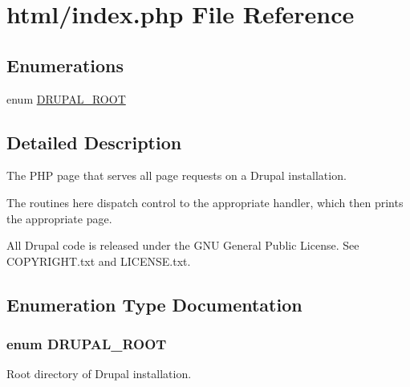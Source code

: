 \hypertarget{index_8php}{
\section{html/index.php File Reference}
\label{index_8php}
}
\subsection*{Enumerations}
\begin{DoxyCompactItemize}
\item 
enum \hyperlink{index_8php_a21cf187d162beffb1fbc5a1d1098f4f9}{DRUPAL\_\-ROOT} 
\end{DoxyCompactItemize}


\subsection{Detailed Description}
The PHP page that serves all page requests on a Drupal installation.

The routines here dispatch control to the appropriate handler, which then prints the appropriate page.

All Drupal code is released under the GNU General Public License. See COPYRIGHT.txt and LICENSE.txt. 

\subsection{Enumeration Type Documentation}
\hypertarget{index_8php_a21cf187d162beffb1fbc5a1d1098f4f9}{
\subsubsection[{DRUPAL\_\-ROOT}]{\setlength{\rightskip}{0pt plus 5cm}enum {\bf DRUPAL\_\-ROOT}}}
\label{index_8php_a21cf187d162beffb1fbc5a1d1098f4f9}
Root directory of Drupal installation. 